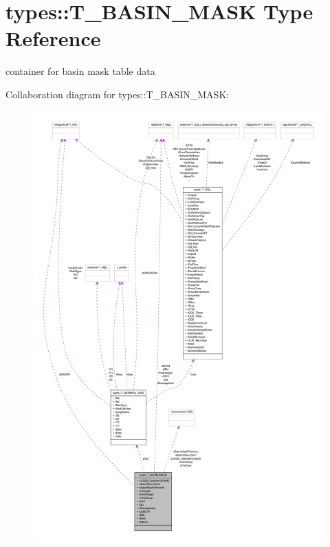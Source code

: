 \hypertarget{typetypes_1_1_t___b_a_s_i_n___m_a_s_k}{
\section{types::T\_\-BASIN\_\-MASK Type Reference}
\label{typetypes_1_1_t___b_a_s_i_n___m_a_s_k}
}


container for basin mask table data  




Collaboration diagram for types::T\_\-BASIN\_\-MASK:\nopagebreak
\begin{figure}[H]
\begin{center}
\leavevmode
\includegraphics[width=400pt]{typetypes_1_1_t___b_a_s_i_n___m_a_s_k__coll__graph}
\end{center}
\end{figure}

